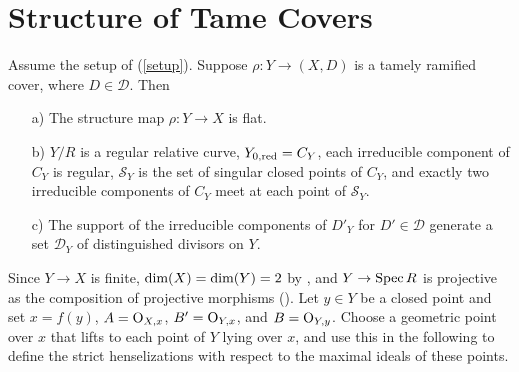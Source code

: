 \documentclass{amsart}
\theoremstyle{plain}
\theoremstyle{definition}
\theoremstyle{remark}
\numberwithin{equation}{section}%
\renewcommand{\O}{{\text{\rm O}}}
\renewcommand{\S}{{\mathcal S}}
\renewcommand{\dim}{{\text{\rm dim}}}
\newcommand{\pf}{{\noindent{\it Proof.}\;\;}}
\newcommand{\red}{{\text{\rm red}}}
\newcommand{\Spec}{{\text{\rm Spec}\,}}
\begin{document}


\section{Structure of Tame Covers}


\Lemma[Structure]\label{structure}
Assume the setup of (\ref{setup}).
Suppose $\rho:Y\to(X,D)$ is a tamely ramified cover, where $D\in\mathscr D$.
Then 
\begin{enumerate}
\item[a)]
The structure map $\rho:Y\to X$ is flat.
\item[b)]
$Y/R$ is a regular relative curve, $Y_{0,\red}=C_Y$,
each irreducible component of $C_Y$ is regular,
$\S_Y$ is the set of singular closed points of $C_Y$,
and exactly two irreducible components of $C_Y$ meet at each point of $\S_Y$.
\item[c)]
The support of the irreducible components of $D'_Y$ for $D'\in\mathscr D$
generate a set $\mathscr D_Y$ of distinguished divisors on $Y$.
\end{enumerate}
\rm

\pf
Since $Y\to X$ is finite, $\dim(X)=\dim(Y)=2$ by \cite[5.4.2]{EGAIV:b}, and $Y\to\Spec R$
is projective as the composition of projective morphisms (\cite[3.3.32]{Liu}).
Let $y\in Y$ be a closed point and set $x=f(y)$, $A=\O_{X,x}$, $B'=\O_{Y,x}$, and $B=\O_{Y,y}$.
Choose a geometric point over $x$ that lifts to each point of $Y$ lying over $x$,
and use this in the following to define the strict henselizations with respect to the maximal ideals
of these points.
\end{document}
